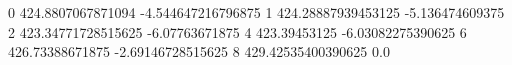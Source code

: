 0 424.8807067871094 -4.544647216796875
1 424.28887939453125 -5.136474609375
2 423.34771728515625 -6.07763671875
4 423.39453125 -6.03082275390625
6 426.73388671875 -2.69146728515625
8 429.42535400390625 0.0
